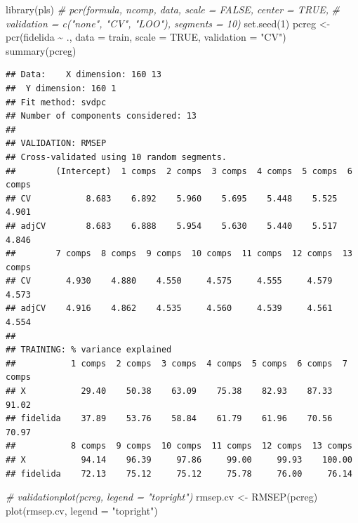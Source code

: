 \documentclass[
]{book}
\newenvironment{Shaded}{\begin{snugshade}}{\end{snugshade}}
\newcommand{\AttributeTok}[1]{\textcolor[rgb]{0.77,0.63,0.00}{#1}}
\newcommand{\CommentTok}[1]{\textcolor[rgb]{0.56,0.35,0.01}{\textit{#1}}}
\newcommand{\ConstantTok}[1]{\textcolor[rgb]{0.00,0.00,0.00}{#1}}
\newcommand{\DecValTok}[1]{\textcolor[rgb]{0.00,0.00,0.81}{#1}}
\newcommand{\FunctionTok}[1]{\textcolor[rgb]{0.00,0.00,0.00}{#1}}
\newcommand{\NormalTok}[1]{#1}
\newcommand{\OtherTok}[1]{\textcolor[rgb]{0.56,0.35,0.01}{#1}}
\newcommand{\SpecialCharTok}[1]{\textcolor[rgb]{0.00,0.00,0.00}{#1}}
\newcommand{\StringTok}[1]{\textcolor[rgb]{0.31,0.60,0.02}{#1}}
\theoremstyle{break}
\theoremstyle{definition}
\theoremstyle{definition}
\theoremstyle{definition}
\theoremstyle{definition}
\theoremstyle{remark}
\begin{document}
\begin{Shaded}
\begin{Highlighting}[]
\FunctionTok{library}\NormalTok{(pls)}
\CommentTok{\# pcr(formula, ncomp, data, scale = FALSE, center = TRUE, }
\CommentTok{\#     validation = c("none", "CV", "LOO"), segments = 10)}
\FunctionTok{set.seed}\NormalTok{(}\DecValTok{1}\NormalTok{)}
\NormalTok{pcreg }\OtherTok{\textless{}{-}} \FunctionTok{pcr}\NormalTok{(fidelida }\SpecialCharTok{\textasciitilde{}}\NormalTok{ ., }\AttributeTok{data =}\NormalTok{ train, }\AttributeTok{scale =} \ConstantTok{TRUE}\NormalTok{, }\AttributeTok{validation =} \StringTok{"CV"}\NormalTok{)}
\FunctionTok{summary}\NormalTok{(pcreg)}
\end{Highlighting}
\end{Shaded}

\begin{verbatim}
## Data:    X dimension: 160 13 
##  Y dimension: 160 1
## Fit method: svdpc
## Number of components considered: 13
## 
## VALIDATION: RMSEP
## Cross-validated using 10 random segments.
##        (Intercept)  1 comps  2 comps  3 comps  4 comps  5 comps  6 comps
## CV           8.683    6.892    5.960    5.695    5.448    5.525    4.901
## adjCV        8.683    6.888    5.954    5.630    5.440    5.517    4.846
##        7 comps  8 comps  9 comps  10 comps  11 comps  12 comps  13 comps
## CV       4.930    4.880    4.550     4.575     4.555     4.579     4.573
## adjCV    4.916    4.862    4.535     4.560     4.539     4.561     4.554
## 
## TRAINING: % variance explained
##           1 comps  2 comps  3 comps  4 comps  5 comps  6 comps  7 comps
## X           29.40    50.38    63.09    75.38    82.93    87.33    91.02
## fidelida    37.89    53.76    58.84    61.79    61.96    70.56    70.97
##           8 comps  9 comps  10 comps  11 comps  12 comps  13 comps
## X           94.14    96.39     97.86     99.00     99.93    100.00
## fidelida    72.13    75.12     75.12     75.78     76.00     76.14
\end{verbatim}

\begin{Shaded}
\begin{Highlighting}[]
\CommentTok{\# validationplot(pcreg, legend = "topright") }
\NormalTok{rmsep.cv }\OtherTok{\textless{}{-}} \FunctionTok{RMSEP}\NormalTok{(pcreg)}
\FunctionTok{plot}\NormalTok{(rmsep.cv, }\AttributeTok{legend =} \StringTok{"topright"}\NormalTok{)}
\end{Highlighting}
\end{Shaded}
\end{document}
